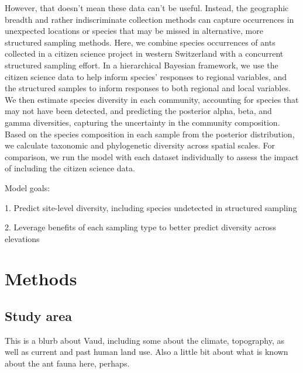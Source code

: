 \documentclass[10pt,a4paper,draft]{article}
\begin{document}
However, that doesn't mean these data can't be useful. Instead, the geographic breadth and rather indiscriminate collection methods can capture occurrences in unexpected locations or species that may be missed in alternative, more structured sampling methods. Here, we combine species occurrences of ants collected in a citizen science project in western Switzerland with a concurrent structured sampling effort. In a hierarchical Bayesian framework, we use the citizen science data to help inform species' responses to regional variables, and the structured samples to inform responses to both regional and local variables. We then estimate species diversity in each community, accounting for species that may not have been detected, and predicting the posterior alpha, beta, and gamma diversities, capturing the uncertainty in the community composition. Based on the species composition in each sample from the posterior distribution, we calculate taxonomic and phylogenetic diversity across spatial scales. For comparison, we run the model with each dataset individually to assess the impact of including the citizen science data.

Model goals:

1. Predict site-level diversity, including species undetected in structured sampling

2. Leverage benefits of each sampling type to better predict diversity across elevations






\section{Methods}
\subsection{Study area}
This is a blurb about Vaud, including some about the climate, topography, as well as current and past human land use. Also a little bit about what is known about the ant fauna here, perhaps.
\end{document}

